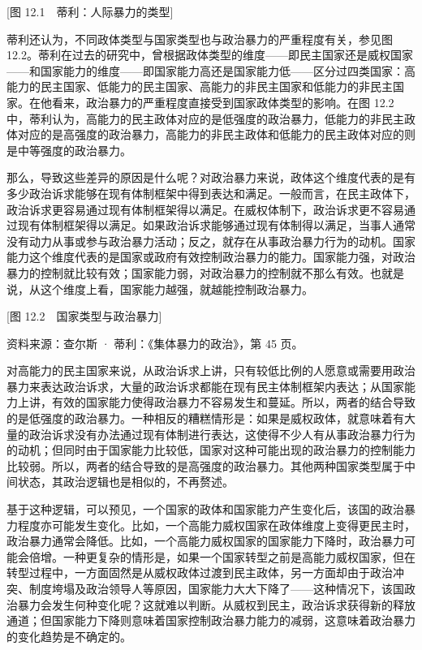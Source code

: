 [图 12.1　蒂利：人际暴力的类型]

蒂利还认为，不同政体类型与国家类型也与政治暴力的严重程度有关，参见图 12.2。蒂利在过去的研究中，曾根据政体类型的维度——即民主国家还是威权国家——和国家能力的维度——即国家能力高还是国家能力低——区分过四类国家：高能力的民主国家、低能力的民主国家、高能力的非民主国家和低能力的非民主国家。在他看来，政治暴力的严重程度直接受到国家政体类型的影响。在图 12.2 中，蒂利认为，高能力的民主政体对应的是低强度的政治暴力，低能力的非民主政体对应的是高强度的政治暴力，高能力的非民主政体和低能力的民主政体对应的则是中等强度的政治暴力。

那么，导致这些差异的原因是什么呢？对政治暴力来说，政体这个维度代表的是有多少政治诉求能够在现有体制框架中得到表达和满足。一般而言，在民主政体下，政治诉求更容易通过现有体制框架得以满足。在威权体制下，政治诉求更不容易通过现有体制框架得以满足。如果政治诉求能够通过现有体制得以满足，当事人通常没有动力从事或参与政治暴力活动；反之，就存在从事政治暴力行为的动机。国家能力这个维度代表的是国家或政府有效控制政治暴力的能力。国家能力强，对政治暴力的控制就比较有效；国家能力弱，对政治暴力的控制就不那么有效。也就是说，从这个维度上看，国家能力越强，就越能控制政治暴力。

[图 12.2　国家类型与政治暴力]

资料来源：查尔斯 · 蒂利：《集体暴力的政治》，第 45 页。

对高能力的民主国家来说，从政治诉求上讲，只有较低比例的人愿意或需要用政治暴力来表达政治诉求，大量的政治诉求都能在现有民主体制框架内表达；从国家能力上讲，有效的国家能力使得政治暴力不容易发生和蔓延。所以，两者的结合导致的是低强度的政治暴力。一种相反的糟糕情形是：如果是威权政体，就意味着有大量的政治诉求没有办法通过现有体制进行表达，这使得不少人有从事政治暴力行为的动机；但同时由于国家能力比较低，国家对这种可能出现的政治暴力的控制能力比较弱。所以，两者的结合导致的是高强度的政治暴力。其他两种国家类型属于中间状态，其政治逻辑也是相似的，不再赘述。

基于这种逻辑，可以预见，一个国家的政体和国家能力产生变化后，该国的政治暴力程度亦可能发生变化。比如，一个高能力威权国家在政体维度上变得更民主时，政治暴力通常会降低。比如，一个高能力威权国家的国家能力下降时，政治暴力可能会倍增。一种更复杂的情形是，如果一个国家转型之前是高能力威权国家，但在转型过程中，一方面固然是从威权政体过渡到民主政体，另一方面却由于政治冲突、制度垮塌及政治领导人等原因，国家能力大大下降了——这种情况下，该国政治暴力会发生何种变化呢？这就难以判断。从威权到民主，政治诉求获得新的释放通道；但国家能力下降则意味着国家控制政治暴力能力的减弱，这意味着政治暴力的变化趋势是不确定的。

